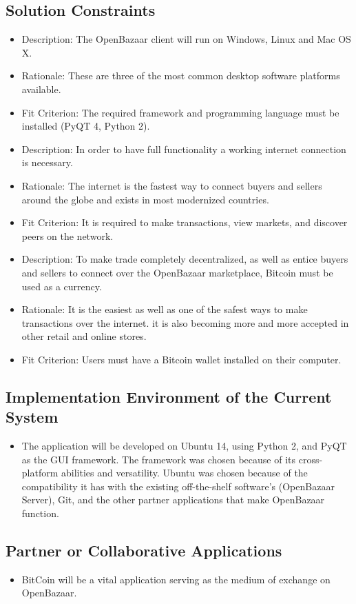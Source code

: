 \documentclass{article}
\begin{document}
\subsection{Solution Constraints}
\begin{itemize}
\item
Description: The OpenBazaar client will run on Windows, Linux and Mac OS X. 
\item
Rationale: These are three of the most common desktop software platforms available. 
\item
Fit Criterion: The required framework and programming language must be installed (PyQT 4, Python 2).
\item
Description: In order to have full functionality a working internet connection is necessary.
\item
Rationale: The internet is the fastest way to connect buyers and sellers around the globe and exists in most modernized countries.
\item
Fit Criterion: It is required to make transactions, view markets, and discover peers on the network.
\item
Description: To make trade completely decentralized, as well as entice buyers and sellers to connect over the OpenBazaar marketplace, Bitcoin must be used as a currency. 
\item
Rationale: It is the easiest as well as one of the safest ways to make transactions over the internet. it is also becoming more and more accepted in other retail and online stores. 
\item
Fit Criterion: Users must have a Bitcoin wallet installed on their computer. 
\end{itemize}
\subsection{Implementation Environment of the Current System}
\begin{itemize}
\item
The application will be developed on Ubuntu 14, using Python 2, and PyQT as the GUI framework. The framework was chosen because of its cross-platform abilities and versatility. Ubuntu was chosen because of the compatibility it has with the existing off-the-shelf software’s (OpenBazaar Server), Git, and the other partner applications that make OpenBazaar function. 
\end{itemize}
\subsection{Partner or Collaborative Applications}
\begin{itemize}
\item
BitCoin will be a vital application serving as the medium of exchange on OpenBazaar.
\end{itemize}
\end{document}
